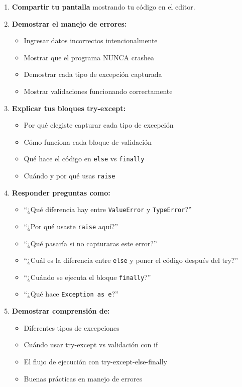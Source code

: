 \documentclass[12pt,a4paper]{article}
\begin{document}
\begin{enumerate}[leftmargin=*]
    \item \textbf{Compartir tu pantalla} mostrando tu código en el editor.
    
    \item \textbf{Demostrar el manejo de errores:}
    \begin{itemize}
        \item Ingresar datos incorrectos intencionalmente
        \item Mostrar que el programa NUNCA crashea
        \item Demostrar cada tipo de excepción capturada
        \item Mostrar validaciones funcionando correctamente
    \end{itemize}
    
    \item \textbf{Explicar tus bloques try-except:}
    \begin{itemize}
        \item Por qué elegiste capturar cada tipo de excepción
        \item Cómo funciona cada bloque de validación
        \item Qué hace el código en \texttt{else} vs \texttt{finally}
        \item Cuándo y por qué usas \texttt{raise}
    \end{itemize}
    
    \item \textbf{Responder preguntas como:}
    \begin{itemize}
        \item ``¿Qué diferencia hay entre \texttt{ValueError} y \texttt{TypeError}?''
        \item ``¿Por qué usaste \texttt{raise} aquí?''
        \item ``¿Qué pasaría si no capturaras este error?''
        \item ``¿Cuál es la diferencia entre \texttt{else} y poner el código después del try?''
        \item ``¿Cuándo se ejecuta el bloque \texttt{finally}?''
        \item ``¿Qué hace \texttt{Exception as e}?''
    \end{itemize}
    
    \item \textbf{Demostrar comprensión de:}
    \begin{itemize}
        \item Diferentes tipos de excepciones
        \item Cuándo usar try-except vs validación con if
        \item El flujo de ejecución con try-except-else-finally
        \item Buenas prácticas en manejo de errores
    \end{itemize}
\end{enumerate}
\end{document}
